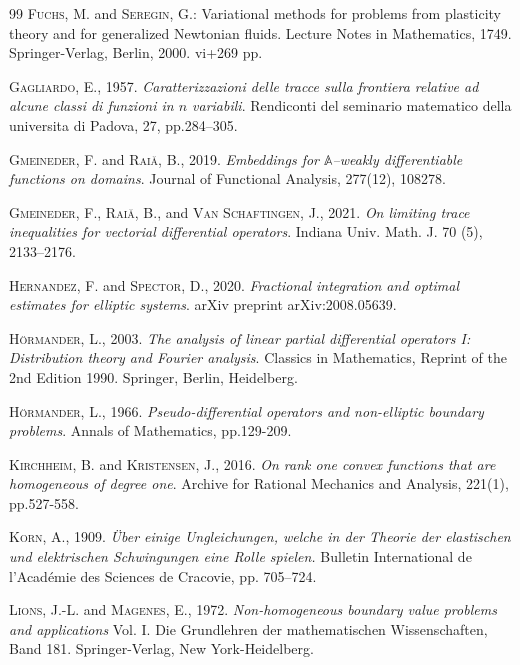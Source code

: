 \documentclass[a4paper,10pt]{amsart}
\numberwithin{equation}{section}
\theoremstyle{remark}
\numberwithin{equation}{section}
\begin{document}
\begin{thebibliography}{99}
		 \textsc{Fuchs, M.} and \textsc{ Seregin, G.}: Variational methods for problems from plasticity theory and for generalized
		Newtonian fluids. Lecture Notes in Mathematics, 1749. Springer-Verlag, Berlin, 2000. vi+269 pp.	
		
		 \textsc{Gagliardo, E.}, 1957. \emph{Caratterizzazioni delle tracce sulla frontiera relative ad alcune classi di funzioni in $ n $ variabili}. Rendiconti del seminario matematico della universita di Padova, 27, pp.284--305.
		
		 \textsc{Gmeineder, F.} and \textsc{Rai\u{a}, B.}, 2019. \emph{Embeddings for $\mathbb {A} $--weakly differentiable functions on domains}. Journal of Functional Analysis, 277(12), 108278.
		
		 \textsc{Gmeineder, F.}, \textsc{Rai\u{a}, B.}, and \textsc{Van Schaftingen, J.}, 2021. \emph{On limiting trace inequalities for vectorial differential operators}.  Indiana Univ. Math. J. 70 (5), 2133--2176.
		
		 \textsc{Hernandez, F.} and \textsc{Spector, D.}, 2020. \emph{Fractional integration and optimal estimates for elliptic systems}. arXiv preprint arXiv:2008.05639.
		
		
		 \textsc{H\"ormander, L.}, 2003. \emph{The analysis of linear partial differential operators I: Distribution theory and Fourier analysis}. Classics in Mathematics, Reprint of the 2nd Edition 1990. Springer, Berlin, Heidelberg.
		
		 \textsc{H\"ormander, L.}, 1966. \emph{Pseudo-differential operators and non-elliptic boundary
			problems}. Annals of Mathematics, pp.129-209.
		
		 \textsc{Kirchheim, B.} and \textsc{Kristensen, J.}, 2016. \emph{On rank one convex functions that are homogeneous of degree one}. Archive for Rational Mechanics and Analysis, 221(1), pp.527-558.
		
		 \textsc{Korn, A.}, 1909. \emph{\"{U}ber einige Ungleichungen, welche in der Theorie der elastischen und elektrischen Schwingungen eine Rolle
			spielen.} Bulletin International de l'Acad\'{e}mie des Sciences de Cracovie, pp. 705--724.
		
		\textsc{Lions, J.-L.} and \textsc{Magenes, E.}, 1972. \emph{Non-homogeneous boundary value problems and applications} Vol. I. Die Grundlehren der mathematischen Wissenschaften, Band 181. Springer-Verlag, New York-Heidelberg.
		

\end{thebibliography}
\end{document}
